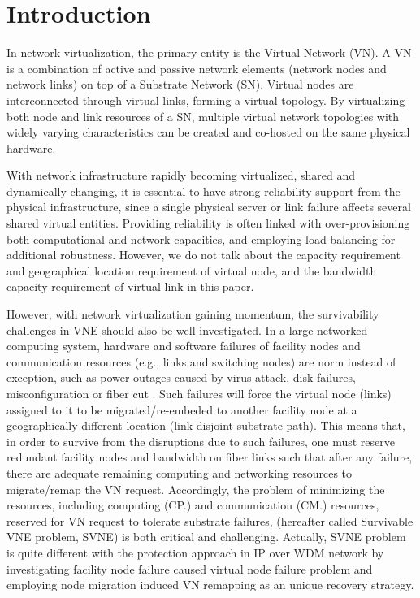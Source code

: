 
\section{Introduction}
In network virtualization, the primary entity is the Virtual Network (VN). A VN is a combination of active and passive network elements (network nodes and network links) on top of a Substrate Network (SN). Virtual nodes are interconnected through virtual links, forming a virtual topology. By virtualizing both node and link resources of a SN, multiple virtual network topologies with widely varying characteristics can be created and co-hosted on the same physical hardware.

With network infrastructure rapidly becoming  virtualized, shared and dynamically changing, it is essential to have strong reliability support from the physical infrastructure, since a single physical server or link failure affects several shared virtual entities. Providing reliability is often linked with over-provisioning both computational and network capacities, and employing load balancing for additional robustness. However, we do not talk about the capacity requirement and geographical location requirement of virtual node, and the bandwidth capacity requirement of virtual link in this paper.



However, with network virtualization gaining momentum, the survivability challenges in VNE should also be well investigated.
In a large networked computing system, hardware and software failures of facility nodes and communication resources
(e.g., links and switching nodes) are norm instead of exception, such as power outages caused by virus attack, disk failures, misconfiguration or fiber cut \cite{xu2012survivable,rahman2010survivable,rahman2013svne,guo2011shared,chen2010resilient}. Such failures will force the virtual node (links) assigned to it to be migrated/re-embeded to another facility node at a geographically different location (link disjoint substrate path). This means that, in order to survive from the disruptions due to such failures, one must reserve redundant facility nodes and bandwidth on fiber links such that after any failure, there are adequate remaining computing and networking resources to migrate/remap the VN request. Accordingly, the problem of minimizing the resources, including computing (CP.) and communication (CM.) resources, reserved for VN request to tolerate substrate failures, (hereafter called Survivable
VNE problem, SVNE) is both critical and challenging. Actually, SVNE problem is quite different with the protection approach
in IP over WDM network by investigating facility node failure caused virtual node failure problem and employing node migration induced VN remapping as an unique recovery strategy.

